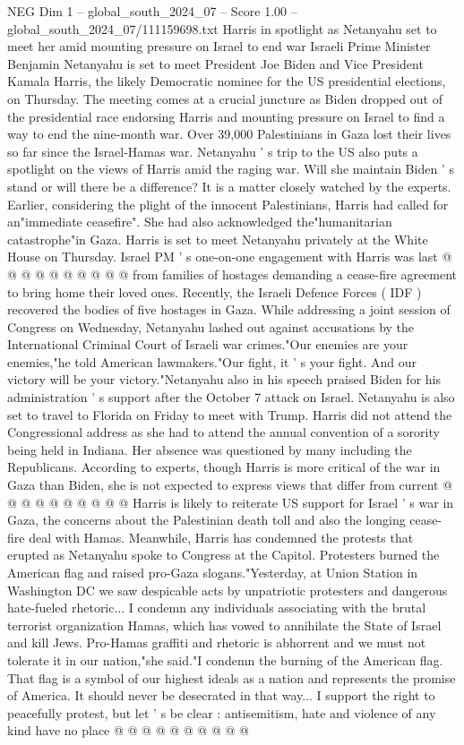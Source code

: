 \begin{textsample}{NEG Dim 1 – global\_south\_2024\_07 – Score 1.00 – global\_south\_2024\_07/111159698.txt}  \label{ex:f1_neg_394}
Harris in spotlight as Netanyahu set to meet her amid mounting pressure on Israel to end war Israeli Prime Minister Benjamin Netanyahu is set to meet President Joe Biden and Vice President Kamala Harris, the likely Democratic nominee for the US presidential elections, on Thursday.
The meeting comes at a crucial juncture as Biden dropped out of the presidential race endorsing Harris and mounting pressure on Israel to find a way to end the nine-month war.
Over 39,000 Palestinians in Gaza lost their lives so far since the Israel-Hamas war.
Netanyahu ' s trip to the US also puts a spotlight on the views of Harris amid the raging war.
Will she maintain Biden ' s stand or will there be a difference?
It is a matter closely watched by the experts.
Earlier, considering the plight of the innocent Palestinians, Harris had called for an"immediate ceasefire".
She had also acknowledged the"humanitarian catastrophe"in Gaza.
Harris is set to meet Netanyahu privately at the White House on Thursday.
Israel PM ' s one-on-one engagement with Harris was last @ @ @ @ @ @ @ @ @ @ from families of hostages demanding a cease-fire agreement to bring home their loved ones.
Recently, the Israeli Defence Forces ( IDF ) recovered the bodies of five hostages in Gaza.
While addressing a joint session of Congress on Wednesday, Netanyahu lashed out against accusations by the International Criminal Court of Israeli war crimes."Our enemies are your enemies,"he told American lawmakers."Our fight, it ' s your fight.
And our victory will be your victory."Netanyahu also in his speech praised Biden for his administration ' s support after the October 7 attack on Israel.
Netanyahu is also set to travel to Florida on Friday to meet with Trump.
Harris did not attend the Congressional address as she had to attend the annual convention of a sorority being held in Indiana.
Her absence was questioned by many including the Republicans.
According to experts, though Harris is more critical of the war in Gaza than Biden, she is not expected to express views that differ from current @ @ @ @ @ @ @ @ @ @ Harris is likely to reiterate US support for Israel ' s war in Gaza, the concerns about the Palestinian death toll and also the longing cease-fire deal with Hamas.
Meanwhile, Harris has condemned the protests that erupted as Netanyahu spoke to Congress at the Capitol.
Protesters burned the American flag and raised pro-Gaza slogans."Yesterday, at Union Station in Washington DC we saw despicable acts by unpatriotic protesters and dangerous hate-fueled rhetoric...
I condemn any individuals associating with the brutal terrorist organization Hamas, which has vowed to annihilate the State of Israel and kill Jews.
Pro-Hamas graffiti and rhetoric is abhorrent and we must not tolerate it in our nation,"she said."I condemn the burning of the American flag.
That flag is a symbol of our highest ideals as a nation and represents the promise of America.
It should never be desecrated in that way...
I support the right to peacefully protest, but let ' s be clear : antisemitism, hate and violence of any kind have no place @ @ @ @ @ @ @ @ @ @

\end{textsample}
